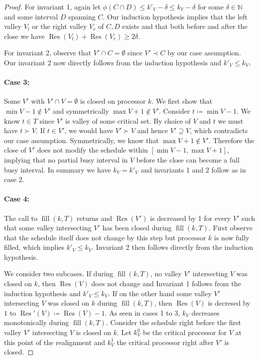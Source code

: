 \documentclass[a4paper]{article}
\DeclareMathOperator{\fillop}{fill}
\DeclareMathOperator{\res}{Res}
\begin{document}
\begin{proof}
      For invariant 1, again let $\phi(C \cap D) \leq k'_V - \delta \leq k_V - \delta$ for some $\delta \in \mathbb{N}$ and some interval $D$ spanning $C$.
      Our induction hypothesis implies that the left valley $V_l$ or the right valley $V_r$ of $C, D$ exists and that both before and after the close we have $\res(V_l) + \res(V_r) \geq 2 \delta$.

      For invariant 2, observe that $V' \cap C = \emptyset$ since $V' \prec C$ by our case assumption.
      Our invariant 2 now directly follows from the induction hypothesis and $k'_V \leq k_V$.


  \paragraph{Case 3:}
      Some $V'$ with $V' \cap V = \emptyset$ is closed on processor $k$.
      We first show that $\min V - 1 \notin V'$ and symmetrically $\max V + 1 \notin V'$.
      Consider $t \coloneqq \min V - 1$.
      We know $t \in T$ since $V'$ is valley of some critical set.
      By choice of $V$ and $t$ we must have $t \succ V$.
      If $t \in V'$, we would have $V' \succ V$ and hence $V' \supseteq V$, which contradicts our case assumption.
      Symmetrically, we know that $\max V + 1 \notin V'$.
      Therefore the close of $V'$ does not modify the schedule within $[\min V - 1, \max V + 1]$, implying that no partial busy interval in $V$ before the close can become a full busy interval.
      In summary we have $k_V = k'_V$ and invariants 1 and 2 follow as in case 2.

  \paragraph{Case 4:}
      The call to $\fillop(k, T)$ returns and $\res(V')$ is decreased by 1 for every $V'$ such that some valley intersecting $V'$ has been closed during $\fillop(k, T)$.
      First observe that the schedule itself does not change by this step but processor $k$ is now fully filled, which implies $k'_V \leq k_V$.
      Invariant 2 then follows directly from the induction hypothesis.

      We consider two subcases.
      If during $\fillop(k, T)$, no valley $V'$ intersecting $V$ was closed on $k$, then $\res(V)$ does not change and Invariant 1 follows from the induction hypothesis and $k'_V \leq k_V$.
      If on the other hand some valley $V'$ intersecting $V$ was closed on $k$ during $\fillop(k, T)$, then $\res(V)$ is decresed by $1$ to $\res'(V) \coloneqq \res(V) - 1$.
      As seen in cases 1 to 3, $k_V$ decreases monotonically during $\fillop(k, T)$.
      Consider the schedule right before the first valley $V'$ intersecting $V$ is closed on $k$.
      Let $k^0_V$ be the critical processor for $V$ at this point of the realignment and $k^1_V$ the critical processor right after $V'$ is closed.


\end{proof}
\end{document}
